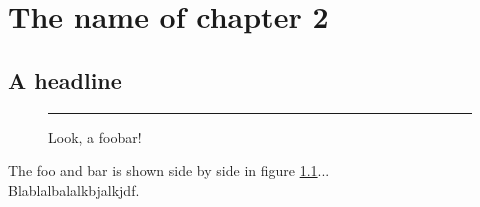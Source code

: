 
\chapter{The name of chapter 2} %

\label{Chapter2} %



\section{A headline}

\begin{figure}[ht!]
     \centering
%
        \hspace{0.02\textwidth}
%
    \rule{35em}{0.5pt}
    \caption[foobar]{
	Look, a foobar!
     }%
   \label{fig:foobar}
\end{figure}

The foo and bar is shown side by side in figure \ref{fig:foobar}...
\\
Blablalbalalkbjalkjdf.


